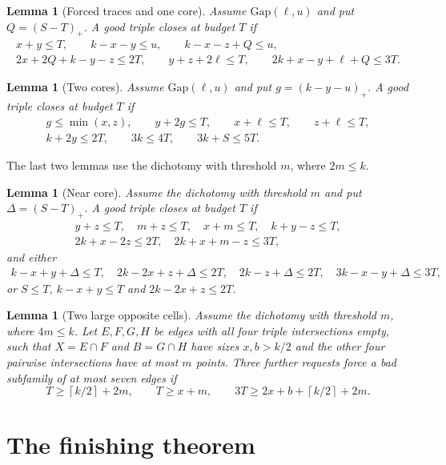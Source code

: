 \documentclass[11pt]{article}
\numberwithin{equation}{section}
\newtheorem{lemma}[theorem]{Lemma}
\theoremstyle{definition}
\theoremstyle{remark}
\newcommand{\ceil}[1]{\left\lceil #1\right\rceil}
\newcommand{\Gap}{\mathrm{Gap}}
\begin{document}
\begin{lemma}[Forced traces and one core]\label{lem:gapcore}
Assume $\Gap(\ell,u)$ and put $Q=(S-T)_+$. A good triple closes at
budget $T$ if
\begin{gather*}
 x+y\le T,\qquad k-x-y\le u,\qquad k-x-z+Q\le u,\\
 2x+2Q+k-y-z\le2T,\qquad y+z+2\ell\le T,\qquad 2k+x-y+\ell+Q\le3T.
\end{gather*}
\end{lemma}

\begin{lemma}[Two cores]\label{lem:twocores}
Assume $\Gap(\ell,u)$ and put $g=(k-y-u)_+$. A good triple closes at
budget $T$ if
\begin{gather*}
 g\le\min(x,z),\qquad y+2g\le T,\qquad x+\ell\le T,\qquad z+\ell\le T,\\
 k+2y\le2T,\qquad 3k\le4T,\qquad 3k+S\le5T.
\end{gather*}
\end{lemma}

The last two lemmas use the dichotomy with threshold $m$, where
$2m\le k$.

\begin{lemma}[Near core]\label{lem:nearcore}
Assume the dichotomy with threshold $m$ and put $\Delta=(S-T)_+$. A good
triple closes at budget $T$ if
\begin{gather*}
 y+z\le T,\quad m+z\le T,\quad x+m\le T,\quad k+y-z\le T,\\
 2k+x-2z\le2T,\quad 2k+x+m-z\le3T,
\end{gather*}
and either
\begin{gather*}
 k-x+y+\Delta\le T,\quad 2k-2x+z+\Delta\le2T,\quad
 2k-z+\Delta\le2T,\quad 3k-x-y+\Delta\le3T,
\end{gather*}
or $S\le T$, $k-x+y\le T$ and $2k-2x+z\le2T$.
\end{lemma}

\begin{lemma}[Two large opposite cells]\label{lem:twolarge}
Assume the dichotomy with threshold $m$, where $4m\le k$. Let $E,F,G,H$
be edges with all four triple intersections empty, such that
$X=E\cap F$ and $B=G\cap H$ have sizes $x,b>k/2$ and the other four
pairwise intersections have at most $m$ points. Three further requests
force a bad subfamily of at most seven edges if
\[
 T\ge\ceil{k/2}+2m,\qquad T\ge x+m,\qquad 3T\ge2x+b+\ceil{k/2}+2m.
\]
\end{lemma}

\section{The finishing theorem}\label{sec:finish}
\end{document}
